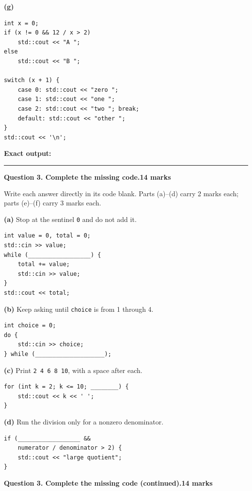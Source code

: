 \documentclass[11pt,a4paper]{article}
\newcommand{\outputbox}[1]{%
  \par\smallskip
  \noindent\textbf{Exact output:}\par
  \vspace{#1}
  \noindent\rule{\linewidth}{0.45pt}%
}
\begin{document}
\vspace{4pt}
\noindent\textbf{(g)}
\begin{lstlisting}[style=cpp]
int x = 0;
if (x != 0 && 12 / x > 2)
    std::cout << "A ";
else
    std::cout << "B ";

switch (x + 1) {
    case 0: std::cout << "zero ";
    case 1: std::cout << "one ";
    case 2: std::cout << "two "; break;
    default: std::cout << "other ";
}
std::cout << '\n';
\end{lstlisting}
\outputbox{7mm}

\newpage
\textbf{Question 3. Complete the missing code.}\hfill\textbf{14 marks}

Write each answer directly in its code blank. Parts (a)--(d) carry 2 marks each; parts (e)--(f) carry 3 marks each.

\textbf{(a)} Stop at the sentinel \lstinline|0| and do not add it.
\begin{lstlisting}[style=cppfill]
int value = 0, total = 0;
std::cin >> value;
while (__________________) {
    total += value;
    std::cin >> value;
}
std::cout << total;
\end{lstlisting}

\vspace{5pt}
\textbf{(b)} Keep asking until \lstinline|choice| is from 1 through 4.
\begin{lstlisting}[style=cppfill]
int choice = 0;
do {
    std::cin >> choice;
} while (____________________);
\end{lstlisting}

\vspace{5pt}
\textbf{(c)} Print \lstinline|2 4 6 8 10|, with a space after each.
\begin{lstlisting}[style=cppfill]
for (int k = 2; k <= 10; ________) {
    std::cout << k << ' ';
}
\end{lstlisting}

\vspace{5pt}
\textbf{(d)} Run the division only for a nonzero denominator.
\begin{lstlisting}[style=cppfill]
if (__________________ &&
    numerator / denominator > 2) {
    std::cout << "large quotient";
}
\end{lstlisting}

\newpage
\textbf{Question 3. Complete the missing code (continued).}\hfill\textbf{14 marks}
\end{document}
